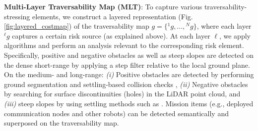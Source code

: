 \documentclass[letterpaper, 10pt, conference]{ieeeconf}      %
\newcommand{\ph}[1]{{\textbf{#1}:}} %
\newcommand{\rev}[1]{{\color{blue}#1}} %
\begin{document}
\ph{Multi-Layer Traversability Map (MLT)}
To capture various traversability-stressing elements, we construct a layered representation (Fig. \ref{fig:layered_costmap}) of the traversability map $g=\{{}^{1}g,...,{}^{N}g\}$, where each layer ${}^{\ell}g$ captures a certain risk source (as explained above). %
At each layer ${\ell}$, we apply algorithms and perform an analysis relevant to the corresponding risk element. 
Specifically, positive and negative obstacles as well as steep slopes are detected on the dense short-range by applying a step filter relative to the local ground plane.
On the medium- and long-range: %
\textit{(i)} Positive obstacles are detected by performing ground segmentation \cite{himmelsbach2010fast} and settling-based collision checks \cite{krusi2017driving}, \textit{(ii)} Negative obstacles by searching for surface discontinuities (holes) in the LiDAR point cloud, and \textit{(iii)} steep slopes by using settling methods such as \cite{krusi2017driving}. Mission items (e.g., deployed communication nodes and other robots) can be detected semantically and superposed on the traversability map.


\end{document}
